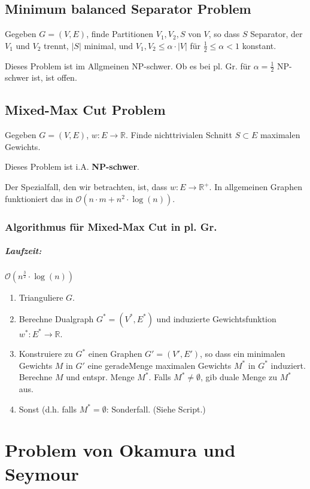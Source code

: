 \documentclass[a4paper,11pt]{report}
\begin{document}
\section{Minimum balanced Separator Problem}
Gegeben $G = (V, E)$, finde Partitionen $V_1, V_2, S$ von $V$, so dass $S$ Separator, der $V_1$ und $V_2$ trennt, $|S|$ minimal, und $V_1, V_2 \leq \alpha \cdot |V|$ für $\frac{1}{2} \leq \alpha < 1$ konstant.

Dieses Problem ist im Allgmeinen NP-schwer. Ob es bei pl. Gr. für $\alpha = \frac{1}{2}$ NP-schwer ist, ist offen.


\section{Mixed-Max Cut Problem}
Gegeben $G = (V, E)$, $w : E \rightarrow \mathbb{R}$. Finde nichttrivialen Schnitt $S \subset E$ maximalen Gewichts.

Dieses Problem ist i.A. {\bf NP-schwer}.

Der Spezialfall, den wir betrachten, ist, dass $w : E \rightarrow \mathbb{R}^+$. In allgemeinen Graphen funktioniert das in $\mathcal{O}(n \cdot m + n^2 \cdot \log(n))$.


\subsection{Algorithmus für Mixed-Max Cut in pl. Gr.}
\paragraph{Laufzeit:} $\mathcal{O}(n^{\frac{3}{2}} \cdot \log(n))$

\begin{enumerate}
    \item Trianguliere $G$.
    \item Berechne Dualgraph $G^* = (V^*, E^*)$ und induzierte Gewichtsfunktion $w^* : E^* \rightarrow \mathbb{R}$.
    \item Konstruiere zu $G^*$ einen Graphen $G' = (V', E')$, so dass ein  minimalen Gewichts $M$ in $G'$ eine \gls{geradeMenge} maximalen Gewichts $M^*$ in $G^*$ induziert. Berechne $M$ und entspr. Menge $M^*$. Falls $M^* \neq \emptyset$, gib duale Menge zu $M^*$ aus.
    \item Sonst (d.h. falls $M^* = \emptyset$: Sonderfall. (Siehe Script.)
\end{enumerate}


\chapter{Problem von Okamura und Seymour}
\end{document}
